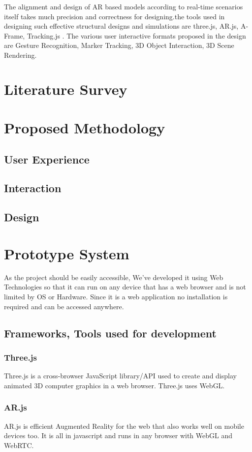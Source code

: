 \documentclass[conference]{IEEEtran}
\begin{document}
The alignment and design of AR based models according to real-time scenarios itself takes much precision and correctness for designing.the tools
used in designing such effective structural designs and simulations are three.js, AR.js, A-Frame, Tracking.js . The various user interactive formats proposed in the
design are Gesture Recognition, Marker Tracking, 3D Object Interaction, 3D Scene Rendering.
\section{Literature Survey}

\section{Proposed Methodology}
\subsection{User Experience}
\subsection{Interaction}
\subsection{Design}

\section{Prototype System}
As the project should be easily accessible, We've developed it using Web Technologies so that it can run on any device that has a web browser and is not limited by OS or Hardware.
Since it is a web application no installation is required and can be accessed anywhere.


\subsection{Frameworks, Tools used for development}
\subsubsection{Three.js} Three.js is a cross-browser JavaScript library/API used to create and display animated 3D computer graphics in a web browser. Three.js uses WebGL.
\subsubsection{AR.js}AR.js is efficient Augmented Reality for the web that also works well on mobile devices too. It is all in javascript and runs in any browser with WebGL and WebRTC. 
\end{document}
